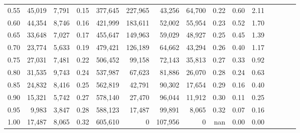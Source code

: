 \begin{tabular}{rrrcrrrrrrrrrrr}
0.55 &  45,019 &  7,791 &                                       0.15 &  377,645 &  227,965 &   43,256 &   64,700 &  0.22 &  0.60 &                         2.11 \\
0.60 &  44,354 &  8,746 &                                       0.16 &  421,999 &  183,611 &   52,002 &   55,954 &  0.23 &  0.52 &                         1.70 \\
0.65 &  33,648 &  7,027 &                                       0.17 &  455,647 &  149,963 &   59,029 &   48,927 &  0.25 &  0.45 &                         1.39 \\
0.70 &  23,774 &  5,633 &                                       0.19 &  479,421 &  126,189 &   64,662 &   43,294 &  0.26 &  0.40 &                         1.17 \\
0.75 &  27,031 &  7,481 &                                       0.22 &  506,452 &   99,158 &   72,143 &   35,813 &  0.27 &  0.33 &                         0.92 \\
0.80 &  31,535 &  9,743 &                                       0.24 &  537,987 &   67,623 &   81,886 &   26,070 &  0.28 &  0.24 &                         0.63 \\
0.85 &  24,832 &  8,416 &                                       0.25 &  562,819 &   42,791 &   90,302 &   17,654 &  0.29 &  0.16 &                         0.40 \\
0.90 &  15,321 &  5,742 &                                       0.27 &  578,140 &   27,470 &   96,044 &   11,912 &  0.30 &  0.11 &                         0.25 \\
0.95 &   9,983 &  3,847 &                                       0.28 &  588,123 &   17,487 &   99,891 &    8,065 &  0.32 &  0.07 &                         0.16 \\
1.00 &  17,487 &  8,065 &                                       0.32 &  605,610 &        0 &  107,956 &        0 &   nan &  0.00 &                         0.00 \\
\bottomrule
\end{tabular}

